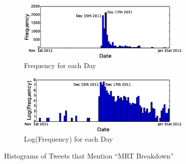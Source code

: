 \documentclass[draft]{sig-alternate}
\begin{document}
\begin{figure}[htb]
	\centering
	\begin{subfigure}{3.3in}
		\includegraphics[width=3.3in]{twitter_mrt_breakdown} %
		\caption{Frequency for each Day}
		\label{fig:twitter_mrt_breakdown}
	\end{subfigure}
	\begin{subfigure}{3.3in}
		\includegraphics[width=3.3in]{twitter_mrt_breakdown_log} %
		\caption{Log(Frequency) for each Day}
		\label{fig:twitter_mrt_breakdown_log}
	\end{subfigure}
	\caption{Histograms of Tweets that Mention ``MRT Breakdown''}
	\label{fig:twitter_histograms}
\end{figure}
\end{document}
